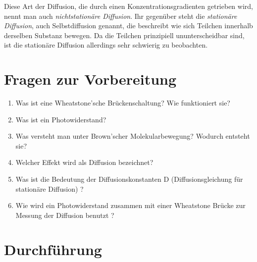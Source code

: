 Diese Art der Diffusion, die durch einen Konzentrationsgradienten getrieben wird, nennt man auch \textit{nichtstationäre Diffusion}. Ihr gegenüber steht die \textit{stationäre Diffusion}, auch Selbstdiffusion genannt, die beschreibt wie sich Teilchen innerhalb derselben Substanz bewegen. Da die Teilchen prinzipiell ununterscheidbar sind, ist die stationäre Diffusion allerdings sehr schwierig zu beobachten.
\section{Fragen zur Vorbereitung}

\begin{enumerate}
 \item Was ist eine Wheatstone'sche Brückenschaltung? Wie funktioniert sie?
 \item Was ist ein Photowiderstand?
 \item Was versteht man unter Brown'scher Molekularbewegung? Wodurch entsteht sie?
 \item Welcher Effekt wird als Diffusion bezeichnet?
 \item Was ist die Bedeutung der Diffusionskonstanten D (Diffusionsgleichung für stationäre Diffusion) ?
 \item Wie wird ein Photowiderstand zusammen mit einer Wheatstone Brücke zur Messung der Diffusion benutzt ?
%
\end{enumerate}

\section{Durchführung} 

